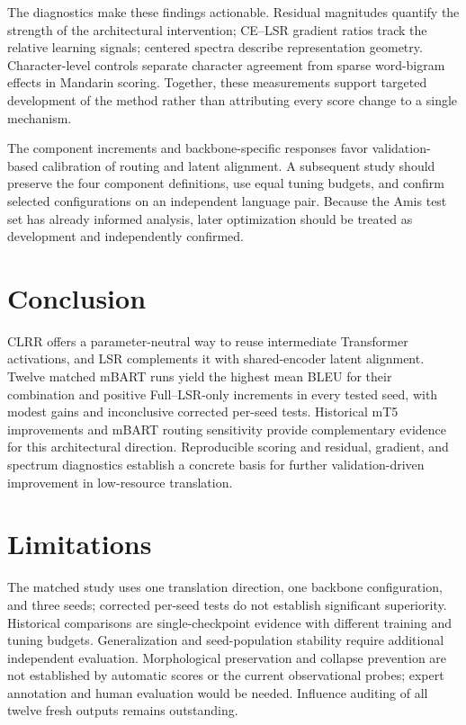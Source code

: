 \documentclass[11pt]{article}
\begin{document}
The diagnostics make these findings actionable. Residual magnitudes quantify the strength of the architectural intervention; CE--LSR gradient ratios track the relative learning signals; centered spectra describe representation geometry. Character-level controls separate character agreement from sparse word-bigram effects in Mandarin scoring. Together, these measurements support targeted development of the method rather than attributing every score change to a single mechanism.

The component increments and backbone-specific responses favor validation-based calibration of routing and latent alignment. A subsequent study should preserve the four component definitions, use equal tuning budgets, and confirm selected configurations on an independent language pair. Because the Amis test set has already informed analysis, later optimization should be treated as development and independently confirmed.

\section{Conclusion}
CLRR offers a parameter-neutral way to reuse intermediate Transformer activations, and LSR complements it with shared-encoder latent alignment. Twelve matched mBART runs yield the highest mean BLEU for their combination and positive Full--LSR-only increments in every tested seed, with modest gains and inconclusive corrected per-seed tests. Historical mT5 improvements and mBART routing sensitivity provide complementary evidence for this architectural direction. Reproducible scoring and residual, gradient, and spectrum diagnostics establish a concrete basis for further validation-driven improvement in low-resource translation.

\section*{Limitations}
The matched study uses one translation direction, one backbone configuration, and three seeds; corrected per-seed tests do not establish significant superiority. Historical comparisons are single-checkpoint evidence with different training and tuning budgets. Generalization and seed-population stability require additional independent evaluation. Morphological preservation and collapse prevention are not established by automatic scores or the current observational probes; expert annotation and human evaluation would be needed. Influence auditing of all twelve fresh outputs remains outstanding.
\end{document}

